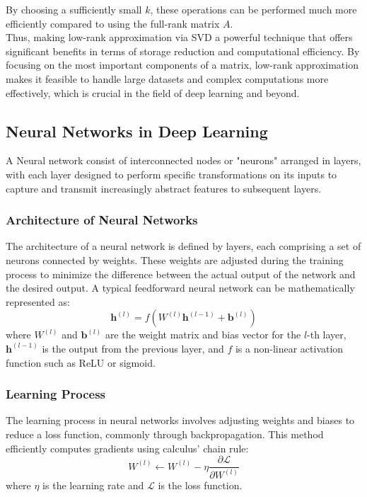     By choosing a sufficiently small $k$, these operations can be performed much more efficiently compared to using the full-rank matrix $A$.\\
    Thus, making low-rank approximation via SVD a powerful technique that offers significant benefits in terms of storage reduction and computational efficiency. By focusing on the most important components of a matrix, low-rank approximation makes it feasible to handle large datasets and complex computations more effectively, which is crucial in the field of deep learning and beyond.
    
\subsection{Neural Networks in Deep Learning}
   A Neural network consist of interconnected nodes or "neurons" arranged in layers, with each layer designed to perform specific transformations on its inputs to capture and transmit increasingly abstract features to subsequent layers.
    
    \subsubsection{Architecture of Neural Networks}
    The architecture of a neural network is defined by layers, each comprising a set of neurons connected by weights. These weights are adjusted during the training process to minimize the difference between the actual output of the network and the desired output. A typical feedforward neural network can be mathematically represented as:
    \begin{equation}
        \mathbf{h}^{(l)} = f(W^{(l)}\mathbf{h}^{(l-1)} + \mathbf{b}^{(l)})
    \end{equation}
    where $W^{(l)}$ and $\mathbf{b}^{(l)}$ are the weight matrix and bias vector for the $l$-th layer, $\mathbf{h}^{(l-1)}$ is the output from the previous layer, and $f$ is a non-linear activation function such as ReLU or sigmoid.
    
    \subsubsection{Learning Process}
    The learning process in neural networks involves adjusting weights and biases to reduce a loss function, commonly through backpropagation. This method efficiently computes gradients using calculus' chain rule:
    \begin{equation}
        W^{(l)} \leftarrow W^{(l)} - \eta \frac{\partial \mathcal{L}}{\partial W^{(l)}}
    \end{equation}
    where $\eta$ is the learning rate and $\mathcal{L}$ is the loss function.
    
